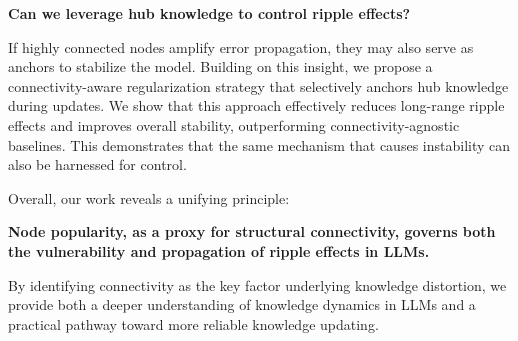 \textbf{Can we leverage hub knowledge to control ripple effects?}


If highly connected nodes amplify error propagation, they may also serve as anchors to stabilize the model. Building on this insight, we propose a connectivity-aware regularization strategy that selectively anchors hub knowledge during updates. We show that this approach effectively reduces long-range ripple effects and improves overall stability, outperforming connectivity-agnostic baselines. This demonstrates that the same mechanism that causes instability can also be harnessed for control.

Overall, our work reveals a unifying principle:

\textbf{Node popularity, as a proxy for structural connectivity, governs both the vulnerability and propagation of ripple effects in LLMs.}

By identifying connectivity as the key factor underlying knowledge distortion, we provide both a deeper understanding of knowledge dynamics in LLMs and a practical pathway toward more reliable knowledge updating.

